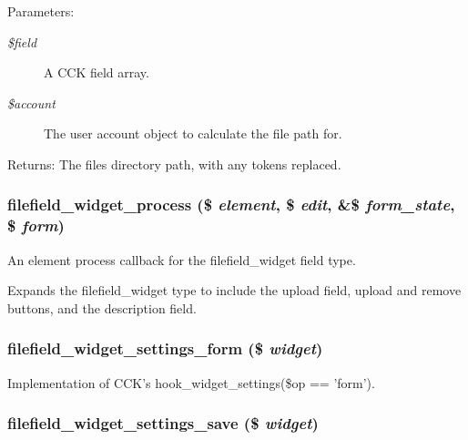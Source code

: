 \begin{Desc}
\item[Parameters:]
\begin{description}
\item[{\em \$field}]A CCK field array. \item[{\em \$account}]The user account object to calculate the file path for. \end{description}
\end{Desc}
\begin{Desc}
\item[Returns:]The files directory path, with any tokens replaced. \end{Desc}
\hypertarget{filefield__widget_8inc_45936448da9575c4ec10adb0e46e97e3}{
\subsubsection[{filefield\_\-widget\_\-process}]{\setlength{\rightskip}{0pt plus 5cm}filefield\_\-widget\_\-process (\$ {\em element}, \/  \$ {\em edit}, \/  \&\$ {\em form\_\-state}, \/  \$ {\em form})}}
\label{filefield__widget_8inc_45936448da9575c4ec10adb0e46e97e3}


An element process callback for the filefield\_\-widget field type.

Expands the filefield\_\-widget type to include the upload field, upload and remove buttons, and the description field. \hypertarget{filefield__widget_8inc_bc36ff4a1ee9c352319ca022556d9f20}{
\subsubsection[{filefield\_\-widget\_\-settings\_\-form}]{\setlength{\rightskip}{0pt plus 5cm}filefield\_\-widget\_\-settings\_\-form (\$ {\em widget})}}
\label{filefield__widget_8inc_bc36ff4a1ee9c352319ca022556d9f20}


Implementation of CCK's hook\_\-widget\_\-settings(\$op == 'form'). \hypertarget{filefield__widget_8inc_aacc98c07dfd3a814c8d32146579c062}{
\subsubsection[{filefield\_\-widget\_\-settings\_\-save}]{\setlength{\rightskip}{0pt plus 5cm}filefield\_\-widget\_\-settings\_\-save (\$ {\em widget})}}
\label{filefield__widget_8inc_aacc98c07dfd3a814c8d32146579c062}


